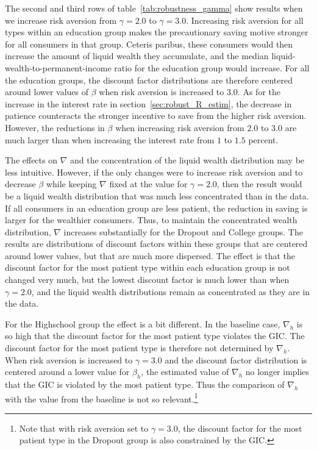 \documentclass[\PathToRoot/\ProjectName]{subfiles}
\begin{document}
The second and third rows of table~\ref{tab:robustness_gamma} show results when we increase risk aversion from $\gamma=2.0$ to $\gamma=3.0$.
Increasing risk aversion for all types within an education group makes the precautionary saving motive stronger for all consumers in that group.
Ceteris paribus, these consumers would then increase the amount of liquid wealth they accumulate, and the median liquid-wealth-to-permanent-income ratio for the education group would increase.
For all the education groups, the discount factor distributions are therefore centered around lower values of $\beta$ when risk aversion is increased to $3.0$.
As for the increase in the interest rate in section~\ref{sec:robust_R_estim}, the decrease in patience counteracts the stronger incentive to save from the higher risk aversion.
However, the reductions in $\beta$ when increasing risk aversion from $2.0$ to $3.0$ are much larger than when increasing the interest rate from $1$ to $1.5$ percent.

The effects on $\nabla$ and the concentration of the liquid wealth distribution may be less intuitive.
However, if the only changes were to increase risk aversion and to decrease $\beta$ while keeping $\nabla$ fixed at the value for $\gamma=2.0$, then the result would be a liquid wealth distribution that was much less concentrated than in the data.
If all consumers in an education group are less patient, the reduction in saving is larger for the wealthier consumers.
Thus, to maintain the concentrated wealth distribution, $\nabla$ increases substantially for the Dropout and College groups.
The results are distributions of discount factors within these groups that are centered around lower values, but that are much more dispersed.
The effect is that the discount factor for the most patient type within each education group is not changed very much, but the lowest discount factor is much lower than when $\gamma=2.0$, and the liquid wealth distributions remain as concentrated as they are in the data.

For the Highschool group the effect is a bit different.
In the baseline case, $\nabla_h$ is so high that the discount factor for the most patient type violates the GIC.
The discount factor for the most patient type is therefore not determined by $\nabla_h$.
When risk aversion is increased to $\gamma=3.0$ and the discount factor distribution is centered around a lower value for $\beta_h$, the estimated value of $\nabla_h$ no longer implies that the GIC is violated by the most patient type.
Thus the comparison of $\nabla_h$ with the value from the baseline is not so relevant.\footnote{Note that with risk aversion set to $\gamma=3.0$, the discount factor for the most patient type in the Dropout group is also constrained by the GIC.}
\end{document}
